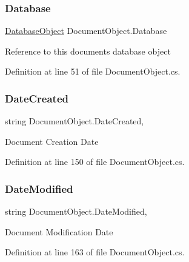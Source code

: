 \subsubsection{\texorpdfstring{Database}{Database}}
{\footnotesize\ttfamily \hyperlink{class_database_object}{Database\+Object} Document\+Object.\+Database\hspace{0.3cm}{\ttfamily [get]}}



Reference to this documents database object 



Definition at line 51 of file Document\+Object.\+cs.

\mbox{\label{class_document_object_a819cb8baad094f6e5990c54ec1eee8b0}} 
\subsubsection{\texorpdfstring{Date\+Created}{DateCreated}}
{\footnotesize\ttfamily string Document\+Object.\+Date\+Created\hspace{0.3cm}{\ttfamily [get]}, {\ttfamily [set]}}



Document Creation Date 



Definition at line 150 of file Document\+Object.\+cs.

\mbox{\label{class_document_object_a87ba1b3ac1b74b104972c25b245c504b}} 
\subsubsection{\texorpdfstring{Date\+Modified}{DateModified}}
{\footnotesize\ttfamily string Document\+Object.\+Date\+Modified\hspace{0.3cm}{\ttfamily [get]}, {\ttfamily [set]}}



Document Modification Date 



Definition at line 163 of file Document\+Object.\+cs.

